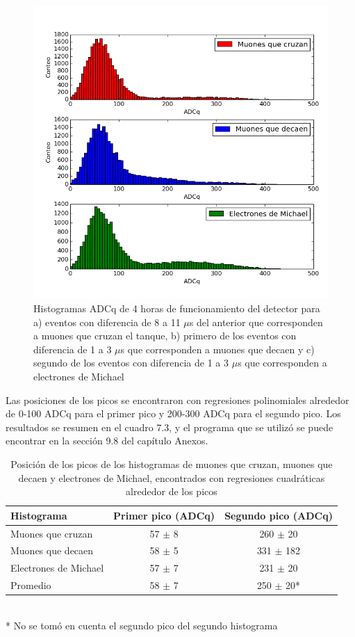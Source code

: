 \documentclass{book}
\begin{document}
\begin{figure}[h] %
\begin{center}
 \includegraphics[width=0.9\linewidth]{HistogramasAll.png}
\caption{Histogramas ADCq de 4 horas de funcionamiento del detector para a) eventos con diferencia de 8 a 11 $\mu$s del anterior que corresponden a muones que cruzan el tanque, b) primero de los eventos con diferencia de 1 a 3 $\mu$s que corresponden a muones que decaen y c) segundo de los eventos con diferencia de 1 a 3 $\mu$s que corresponden a electrones de Michael}
\end{center}
\end{figure}

Las posiciones de los picos se encontraron con regresiones polinomiales alrededor de 0-100 ADCq para el primer pico y 200-300 ADCq para el segundo pico. Los resultados se resumen en el cuadro 7.3, y el programa que se utiliz\'o se puede encontrar en la secci\'on 9.8 del cap\'itulo Anexos.

\begin{table}[h]
\caption{ Posici\'on de los picos de los histogramas de muones que cruzan, muones que decaen y electrones de Michael, encontrados con regresiones cuadr\'aticas alrededor de los picos}
\centering
\begin{tabular}{l | c c}
\hline
Histograma & Primer pico (ADCq) & Segundo pico (ADCq) \\ \hline
Muones que cruzan & 57 $\pm$ 8 & 260 $\pm$ 20 \\
Muones que decaen & 58 $\pm$ 5 & 331 $\pm$ 182 \\
Electrones de Michael & 57 $\pm$ 7 & 231 $\pm$ 20\\ \hline
Promedio & 58 $\pm$ 7 & 250 $\pm$ 20*\\

\hline
\end{tabular}\\
* No se tom\'o en cuenta el segundo pico del segundo histograma\end{table}
\end{document}
